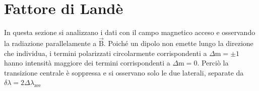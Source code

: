 \documentclass[twocolumn,10pt]{asme2ej}
\begin{document}






\section{Fattore di Landè}\label{s:lande}


In questa sezione si analizzano i dati con il campo magnetico acceso e osservando la radiazione parallelamente a
$\vec{\text{B}}$. Poiché un dipolo non emette lungo la direzione che individua, i termini polarizzati circolarmente
corrispondenti a $\Delta \text{m} = \pm 1$ hanno intensità maggiore dei termini corrispondenti a $\Delta \text{m} = 0$.
Perciò la transizione centrale è soppressa e si osservano solo le due laterali, separate da $\delta\lambda = 2
\Delta\lambda_{\text{zee}}$
 


\end{document}
